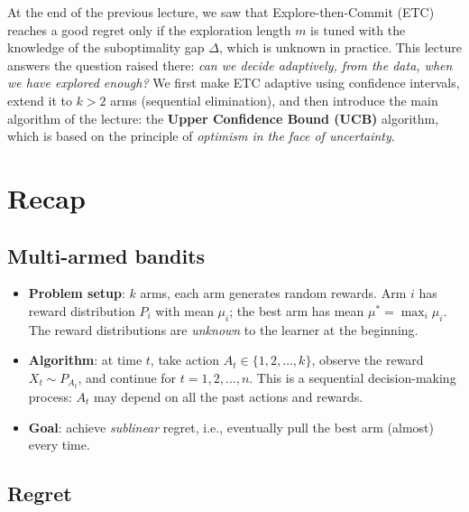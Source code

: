 

At the end of the previous lecture, we saw that Explore-then-Commit (ETC) reaches a good regret only if the exploration length $m$ is tuned with the knowledge of the suboptimality gap $\Delta$, which is unknown in practice. This lecture answers the question raised there: \emph{can we decide adaptively, from the data, when we have explored enough?} We first make ETC adaptive using confidence intervals, extend it to $k > 2$ arms (sequential elimination), and then introduce the main algorithm of the lecture: the \textbf{Upper Confidence Bound (UCB)} algorithm, which is based on the principle of \emph{optimism in the face of uncertainty}.

\section{Recap}

\subsection{Multi-armed bandits}

\begin{itemize}
    \item \textbf{Problem setup}: $k$ arms, each arm generates random rewards. Arm $i$ has reward distribution $P_i$ with mean $\mu_i$; the best arm has mean $\mu^* = \max_i \mu_i$. The reward distributions are \emph{unknown} to the learner at the beginning.
    \item \textbf{Algorithm}: at time $t$, take action $A_t \in \{1, 2, \dots, k\}$, observe the reward $X_t \sim P_{A_t}$, and continue for $t = 1, 2, \dots, n$. This is a sequential decision-making process: $A_t$ may depend on all the past actions and rewards.
    \item \textbf{Goal}: achieve \emph{sublinear} regret, i.e., eventually pull the best arm (almost) every time.
\end{itemize}

\subsection{Regret}

